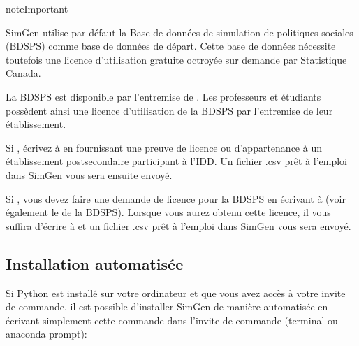 \documentclass[letterpaper,10pt,french]{sphinxmanual}
\begin{document}
\begin{sphinxadmonition}{note}{Important}

SimGen utilise par défaut la Base de données de simulation de politiques sociales (BDSPS) comme base de données de départ. Cette base de données nécessite toutefois une licence d’utilisation gratuite octroyée sur demande par Statistique Canada.

La BDSPS est disponible par l’entremise de  .
Les professeurs et étudiants 
possèdent ainsi une licence d’utilisation de la BDSPS par l’entremise de leur établissement.

Si , écrivez à  en fournissant une preuve de licence ou d’appartenance à un établissement postsecondaire participant à l’IDD.
Un fichier .csv prêt à l’emploi dans SimGen vous sera ensuite envoyé.

Si , vous devez faire une demande de licence pour la BDSPS en écrivant à  (voir également le  de la BDSPS). Lorsque vous aurez obtenu cette licence, il vous suffira d’écrire à  et un fichier .csv prêt à l’emploi dans SimGen vous sera envoyé.
\end{sphinxadmonition}


\subsection{Installation automatisée}
\label{\detokenize{installation:installation-automatisee}}
Si Python est installé sur votre ordinateur et que vous avez accès à votre invite de commande,
il est possible d’installer SimGen de manière automatisée en écrivant simplement cette commande dans l’invite de commande (terminal ou anaconda prompt):

\begin{sphinxVerbatim}[commandchars=\\\{\}]
  
\end{sphinxVerbatim}
\end{document}
